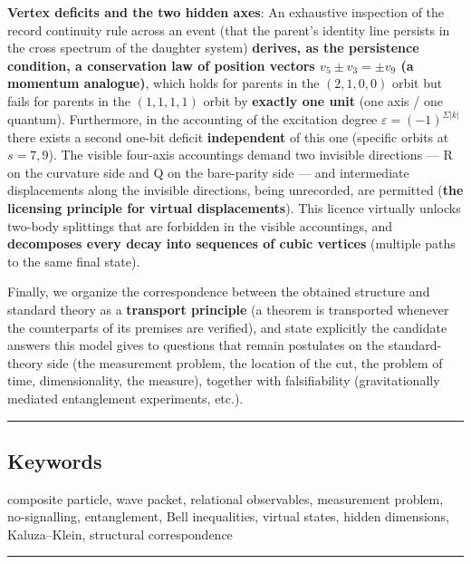 \documentclass[
]{ltjsarticle}
\begin{document}
\textbf{Vertex deficits and the two hidden axes}: An exhaustive
inspection of the record continuity rule across an event (that the
parent's identity line persists in the cross spectrum of the daughter
system) \textbf{derives, as the persistence condition, a conservation
law of position vectors \(v_5\pm v_3=\pm v_9\) (a momentum analogue)},
which holds for parents in the \((2,1,0,0)\) orbit but fails for parents
in the \((1,1,1,1)\) orbit by \textbf{exactly one unit} (one axis / one
quantum). Furthermore, in the accounting of the excitation degree
\(\varepsilon=(-1)^{\Sigma|k|}\) there exists a second one-bit deficit
\textbf{independent} of this one (specific orbits at \(s=7,9\)). The
visible four-axis accountings demand two invisible directions --- R on
the curvature side and Q on the bare-parity side --- and intermediate
displacements along the invisible directions, being unrecorded, are
permitted (\textbf{the licensing principle for virtual displacements}).
This licence virtually unlocks two-body splittings that are forbidden in
the visible accountings, and \textbf{decomposes every decay into
sequences of cubic vertices} (multiple paths to the same final state).

Finally, we organize the correspondence between the obtained structure
and standard theory as a \textbf{transport principle} (a theorem is
transported whenever the counterparts of its premises are verified), and
state explicitly the candidate answers this model gives to questions
that remain postulates on the standard-theory side (the measurement
problem, the location of the cut, the problem of time, dimensionality,
the measure), together with falsifiability (gravitationally mediated
entanglement experiments, etc.).

\begin{center}\rule{0.5\linewidth}{0.5pt}\end{center}

\subsection{Keywords}\label{keywords}

composite particle, wave packet, relational observables, measurement
problem, no-signalling, entanglement, Bell inequalities, virtual states,
hidden dimensions, Kaluza--Klein, structural correspondence

\begin{center}\rule{0.5\linewidth}{0.5pt}\end{center}
\end{document}
